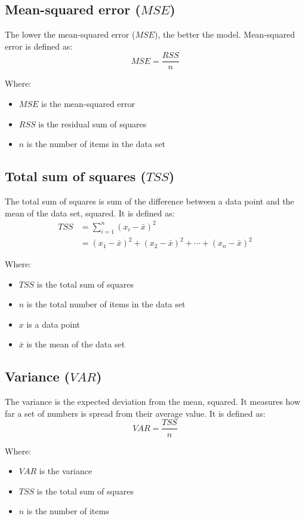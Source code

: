 \documentclass[11pt]{article}
\begin{document}
\subsection{Mean-squared error (\(MSE\))}
\label{sec:org2877d29}
The lower the mean-squared error (\(MSE\)), the better the model. Mean-squared error is defined as:
\[MSE = \frac{RSS}{n} \]

Where:
\begin{itemize}
\item \(MSE\) is the mean-squared error
\item \(RSS\) is the residual sum of squares
\item \(n\) is the number of items in the data set
\end{itemize}

 \newpage
\subsection{Total sum of squares (\(TSS\))}
\label{sec:org58aca54}
The total sum of squares is sum of the difference between a data point and the mean of the data set, squared. It is defined as:
\begin{align*}
TSS &= \sum_{i = 1}^n (x_i - \bar{x})^2 \\
&= (x_1 - \bar{x})^2 + (x_2 - \bar{x})^2 + \cdots + (x_n - \bar{x})^2
\end{align*}

Where:
\begin{itemize}
\item \(TSS\) is the total sum of squares
\item \(n\) is the total number of items in the data set
\item \(x\) is a data point
\item \(\bar{x}\) is the mean of the data set
\end{itemize}
\subsection{Variance (\(VAR\))}
\label{sec:org1ecd7a0}
The variance is the expected deviation from the mean, squared. It measures how far a set of numbers is spread from their average value. It is defined as:
\[VAR = \frac{TSS}{n}\]

Where:
\begin{itemize}
\item \(VAR\) is the variance
\item \(TSS\) is the total sum of squares
\item \(n\) is the number of items
\end{itemize}
\end{document}

